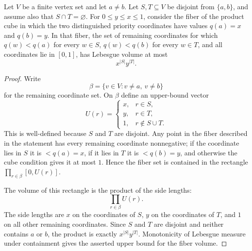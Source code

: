 \begin{helper}
Let \(V\) be a finite vertex set and let \(a\neq b\).  Let \(S,T\subseteq V\)
be disjoint from \(\{a,b\}\), and assume also that \(S\cap T=\varnothing\).
For \(0\le y\le x\le 1\), consider the fiber of the product cube in which
the two distinguished priority coordinates have values \(q(a)=x\) and
\(q(b)=y\).  In that fiber, the set of remaining coordinates for which
\(q(w)<q(a)\) for every \(w\in S\), \(q(w)<q(b)\) for every \(w\in T\), and
all coordinates lie in \([0,1]\), has Lebesgue volume at most
\[
x^{|S|}y^{|T|}.
\]
\end{helper}
\begin{proof}
Write
\[
\beta=\{v\in V:v\neq a,\ v\neq b\}
\]
for the remaining coordinate set.  On \(\beta\) define an upper-bound vector
\[
U(r)=
\begin{cases}
x,& r\in S,\\
y,& r\in T,\\
1,& r\notin S\cup T.
\end{cases}
\]
This is well-defined because \(S\) and \(T\) are disjoint.  Any point in the
fiber described in the statement has every remaining coordinate nonnegative;
if the coordinate lies in \(S\) it is \(<q(a)=x\), if it lies in \(T\) it is
\(<q(b)=y\), and otherwise the cube condition gives it at most \(1\).  Hence
the fiber set is contained in the rectangle \(\prod_{r\in\beta}[0,U(r)]\).

The volume of this rectangle is the product of the side lengths:
\[
\prod_{r\in\beta} U(r).
\]
The side lengths are \(x\) on the coordinates of \(S\), \(y\) on the
coordinates of \(T\), and \(1\) on all other remaining coordinates.  Since
\(S\) and \(T\) are disjoint and neither contains \(a\) or \(b\), the product
is exactly \(x^{|S|}y^{|T|}\).  Monotonicity of Lebesgue measure under
containment gives the asserted upper bound for the fiber volume.
\end{proof}
